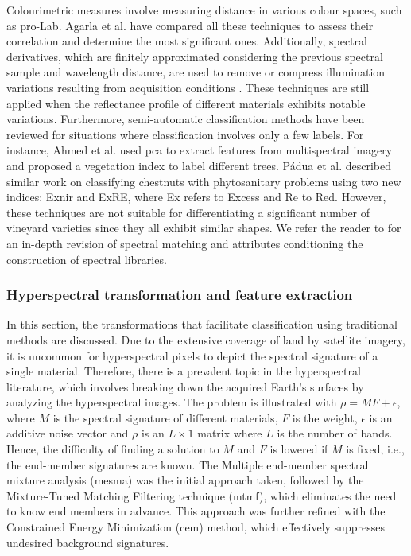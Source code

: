 Colourimetric measures involve measuring distance in various colour spaces, such as pro-Lab. Agarla et al. \cite{agarla_analysis_2021} have compared all these techniques to assess their correlation and determine the most significant ones. Additionally, spectral derivatives, which are finitely approximated considering the previous spectral sample and wavelength distance, are used to remove or compress illumination variations resulting from acquisition conditions \cite{fernandes_grapevine_2019, pu_hyperspectral_2017}. These techniques are still applied when the reflectance profile of different materials exhibits notable variations. Furthermore, semi-automatic classification methods have been reviewed for situations where classification involves only a few labels. For instance, Ahmed et al. \cite{ahmed_applied_2021} used \acrshort{pca} to extract features from multispectral imagery and proposed a vegetation index to label different trees. Pádua et al. \cite{padua_monitoring_2020} described similar work on classifying chestnuts with phytosanitary problems using two new indices: Ex\acrshort{nir} and ExRE, where Ex refers to Excess and Re to Red. However, these techniques are not suitable for differentiating a significant number of vineyard varieties since they all exhibit similar shapes. We refer the reader to \cite{shanmugam_spectral_2014} for an in-depth revision of spectral matching and attributes conditioning the construction of spectral libraries.

\subsubsection{Hyperspectral transformation and feature extraction}

In this section, the transformations that facilitate classification using traditional methods are discussed. Due to the extensive coverage of land by satellite imagery, it is uncommon for hyperspectral pixels to depict the spectral signature of a single material. Therefore, there is a prevalent topic in the hyperspectral literature, which involves breaking down the acquired Earth's surfaces by analyzing the hyperspectral images. The problem is illustrated with $\rho = \textit{MF} + \epsilon$, where $M$ is the spectral signature of different materials, $F$ is the weight, $\epsilon$ is an additive noise vector and $\rho$ is an $L \times 1$ matrix where $L$ is the number of bands. Hence, the difficulty of finding a solution to $M$ and $F$ is lowered if $M$ is fixed, i.e., the end-member signatures are known. The Multiple end-member spectral mixture analysis (\acrshort{mesma}) was the initial approach taken, followed by the Mixture-Tuned Matching Filtering technique (\acrshort{mtmf}), which eliminates the need to know end members in advance. This approach was further refined with the Constrained Energy Minimization (\acrshort{cem}) method, which effectively suppresses undesired background signatures.


